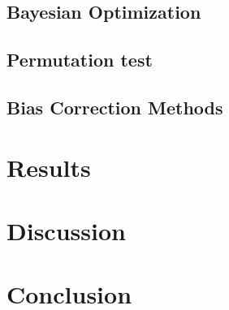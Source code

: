 \documentclass[11pt, fleqn, titlepage]{article}
\begin{document}
	\subsection{Bayesian Optimization}
	
	\subsection{Permutation test}
	
	\subsection{Bias Correction Methods}
	
	\section{Results}
	
	
	\section{Discussion}
	
	
	\section{Conclusion}
	
	
\end{document}
